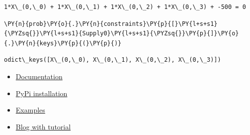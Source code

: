             \begin{tcolorbox}[breakable, size=fbox, boxrule=.5pt, pad at break*=1mm, opacityfill=0]
\begin{Verbatim}[commandchars=\\\{\}]
1*X\_(0,\_0) + 1*X\_(0,\_1) + 1*X\_(0,\_2) + 1*X\_(0,\_3) + -500 = 0
\end{Verbatim}
\end{tcolorbox}
        
    \begin{tcolorbox}[breakable, size=fbox, boxrule=1pt, pad at break*=1mm,colback=cellbackground, colframe=cellborder]
\begin{Verbatim}[commandchars=\\\{\}]
\PY{n}{prob}\PY{o}{.}\PY{n}{constraints}\PY{p}{[}\PY{l+s+s1}{\PYZsq{}}\PY{l+s+s1}{Supply0}\PY{l+s+s1}{\PYZsq{}}\PY{p}{]}\PY{o}{.}\PY{n}{keys}\PY{p}{(}\PY{p}{)}
\end{Verbatim}
\end{tcolorbox}

            \begin{tcolorbox}[breakable, size=fbox, boxrule=.5pt, pad at break*=1mm, opacityfill=0]
\begin{Verbatim}[commandchars=\\\{\}]
odict\_keys([X\_(0,\_0), X\_(0,\_1), X\_(0,\_2), X\_(0,\_3)])
\end{Verbatim}
\end{tcolorbox}
       
\begin{resource}
\begin{itemize}
\item \href{https://coin-or.github.io/pulp/}{Documentation}
\item \href{https://pypi.org/project/PuLP/}{PyPi installation}
\item \href{https://github.com/coin-or/pulp/tree/master/examples}{Examples}
\item \href{https://benalexkeen.com/linear-programming-with-python-and-pulp-part-1/}{Blog with tutorial}
\end{itemize}
\end{resource}

